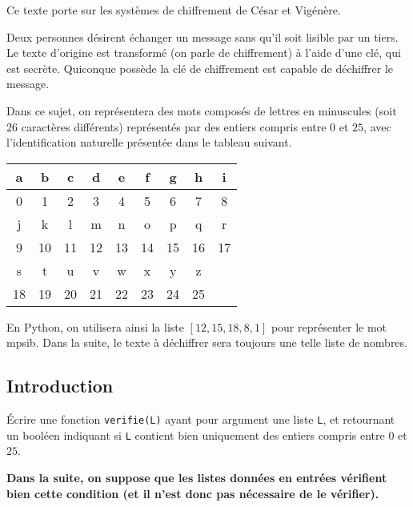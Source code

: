 Ce texte porte sur les systèmes de chiffrement de César et Vigénère.

Deux personnes désirent échanger un message sans qu'il soit lisible par un tiers.
Le texte d'origine est transformé (on parle de chiffrement) à l'aide d'une clé, qui est secrète. Quiconque possède la clé de chiffrement est capable de déchiffrer le message.

Dans ce sujet, on représentera des mots composés de lettres en minuscules (soit 26 caractères différents) représentés par des entiers compris entre $0$ et $25$, avec l'identification naturelle présentée dans le tableau suivant.
\begin{center}
\begin{tabular}{|c|c|c|c|c|c|c|c|c|}
\hline
a  & b  & c  & d  & e  & f  & g  & h  & i \\ \hline
0  & 1  & 2  & 3  & 4  & 5  & 6  & 7  & 8 \\ \hline \hline 
j  & k  & l  & m  & n  & o  & p  & q  & r \\ \hline 
9  & 10 & 11 & 12 & 13 & 14 & 15 & 16 & 17\\ \hline \hline 
s  & t  & u  & v  & w  & x  & y  & z  & \\ \hline
18 & 19 & 20 & 21 & 22 & 23 & 24 & 25 & \\ \hline
\end{tabular}
\end{center}

En Python, on utilisera ainsi la liste $[12,15,18,8,1]$ pour représenter le mot \og mpsib\fg. Dans la suite, le texte à déchiffrer sera toujours une telle liste de nombres. 
%
\subsection*{Introduction}
\'Ecrire une fonction \texttt{verifie(L)} ayant pour argument une liste \texttt{L}, et retournant un booléen indiquant si \texttt{L} contient bien uniquement des entiers compris entre $0$ et $25$.\bigskip

\textbf{Dans la suite, on suppose que les listes données en entrées vérifient bien cette condition (et il n'est donc pas nécessaire de le vérifier).}

